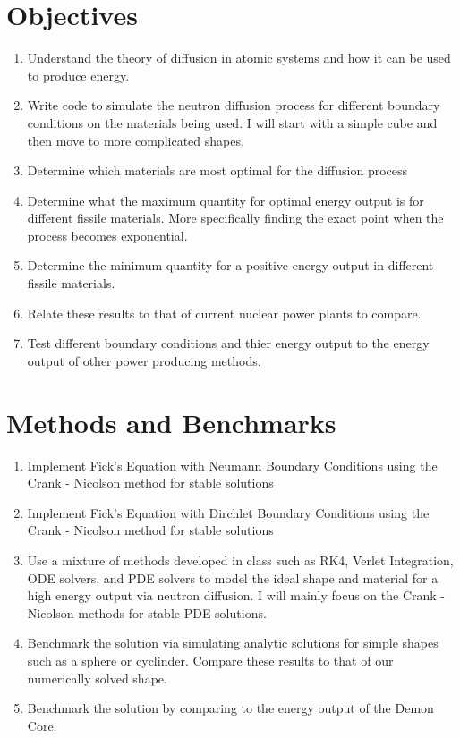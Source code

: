 \documentclass[letterpaper, 12pt]{article}
\begin{document}
    \section*{Objectives}
         \begin{enumerate}
            \item Understand the theory of diffusion in atomic systems and how it can be used to produce energy.
            \item Write code to simulate the neutron diffusion process for different boundary conditions on the materials being used. I will start with a simple cube and then move to more complicated shapes.
            \item Determine which materials are most optimal for the diffusion process
            \item Determine what the maximum quantity for optimal energy output is for different fissile materials. More specifically finding the exact point when the process becomes exponential.
            \item Determine the minimum quantity for a positive energy output in different fissile materials.
            \item Relate these results to that of current nuclear power plants to compare.
            \item Test different boundary conditions and thier energy output to the energy output of other power producing methods.
         \end{enumerate}
         
    \section*{Methods and Benchmarks}
         \begin{enumerate}
            \item Implement Fick's Equation with Neumann Boundary Conditions using the Crank - Nicolson method for stable solutions
            \item Implement Fick's Equation with Dirchlet Boundary Conditions using the Crank - Nicolson method for stable solutions
            \item Use a mixture of methods developed in class such as RK4, Verlet Integration, ODE solvers, and PDE solvers to model the ideal shape and material for a high energy output via neutron diffusion. I will mainly focus on the Crank - Nicolson methods for stable PDE solutions.
            \item Benchmark the solution via simulating analytic solutions for simple shapes such as a sphere or cyclinder. Compare these results to that of our numerically solved shape.
            \item Benchmark the solution by comparing to the energy output of the Demon Core.
         \end{enumerate}

    \vspace{-0.5cm}
    
    
\end{document}
